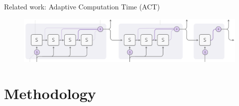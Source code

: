 \documentclass[10pt]{beamer}
\begin{document}


\begin{frame}{Related work: Adaptive Computation Time (ACT)}
    \begin{figure}
        \centering
        \includegraphics[width=1.0\linewidth]{./img/adaptive_comp.png}
    \end{figure}
\end{frame}

\section{Methodology}
\end{document}

